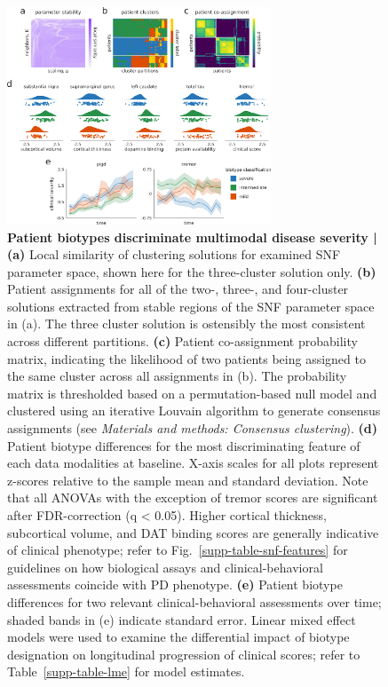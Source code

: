 \documentclass[12pt,aps,pra,reprint,showkeys]{revtex4-1}
\begin{document}
\begin{figure}[t]
\begin{center}
    \centerline{\includegraphics[width=0.70\textwidth]{patient_clusters.pdf}}
    \caption{
      \textbf{Patient biotypes discriminate multimodal disease severity |}
      \textbf{(a)} Local similarity of clustering solutions for examined SNF parameter space, shown here for the three-cluster solution only.
      \textbf{(b)} Patient assignments for all of the two-, three-, and four-cluster solutions extracted from stable regions of the SNF parameter space in (a).
      The three cluster solution is ostensibly the most consistent across different partitions.
      \textbf{(c)} Patient co-assignment probability matrix, indicating the likelihood of two patients being assigned to the same cluster across all assignments in (b).
      The probability matrix is thresholded based on a permutation-based null model and clustered using an iterative Louvain algorithm to generate consensus assignments (see \textit{Materials and methods: Consensus clustering}).
      \textbf{(d)} Patient biotype differences for the most discriminating feature of each data modalities at baseline.
      X-axis scales for all plots represent z-scores relative to the sample mean and standard deviation.
  Note that all ANOVAs with the exception of tremor scores are significant after FDR-correction (q < 0.05).
      Higher cortical thickness, subcortical volume, and DAT binding scores are generally indicative of clinical phenotype; refer to Fig.~\ref{supp-table-snf-features} for guidelines on how biological assays and clinical-behavioral assessments coincide with PD phenotype.
      \textbf{(e)} Patient biotype differences for two relevant clinical-behavioral assessments over time; shaded bands in (e) indicate standard error.
      Linear mixed effect models were used to examine the differential impact of biotype designation on longitudinal progression of clinical scores; refer to Table~\ref{supp-table-lme} for model estimates.
    }
    \label{figure-clusters}
\end{center}
\end{figure}
\end{document}
